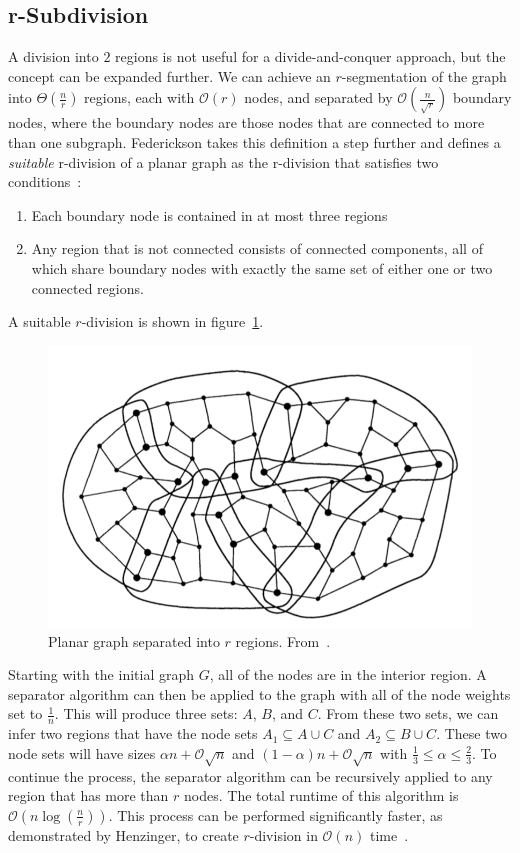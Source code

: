 \documentclass[11pt]{article}
\begin{document}
\subsection{r-Subdivision}
\label{sec:graph-sep-rsub}

A division into $2$ regions is not useful for a divide-and-conquer approach, but the concept can be expanded further. We can achieve an $r$-segmentation of the graph into $\Theta \left (\frac{n}{r} \right )$ regions, each with $\mathcal{O}(r)$ nodes, and separated by $\mathcal{O} \left (\frac{n}{\sqrt{r}} \right )$ boundary nodes, where the boundary nodes are those nodes that are connected to more than one subgraph. Federickson takes this definition a step further and defines a \textit{suitable} r-division of a planar graph as the r-division that satisfies two conditions~\cite{federickson1987fast}:
\begin{enumerate}
    \item Each boundary node is contained in at most three regions

    \item Any region that is not connected consists of connected components, all of which share boundary nodes with exactly the same set of either one or two connected regions.
\end{enumerate}
A suitable $r$-division is shown in figure~\ref{fig:rsep}.

\begin{figure}[!htb]
    \centering
    \includegraphics[width=.4\textwidth]{rsep}
    \caption{Planar graph separated into $r$ regions. From~\cite{federickson1987fast}.}
    \label{fig:rsep}
\end{figure}

Starting with the initial graph $G$, all of the nodes are in the interior region. A separator algorithm can then be applied to the graph with all of the node weights set to $\frac{1}{n}$. This will produce three sets: $A$, $B$, and $C$. From these two sets, we can infer two regions that have the node sets $A_1 \subseteq A \cup C$ and $A_2 \subseteq B \cup C$. These two node sets will have sizes $\alpha n + \mathcal{O}\sqrt{n}$ and $(1 - \alpha) n + \mathcal{O}\sqrt{n}$ with $\frac{1}{3} \leq \alpha \leq \frac{2}{3}$. To continue the process, the separator algorithm can be recursively applied to any region that has more than $r$ nodes. The total runtime of this algorithm is $\mathcal{O} \left (n \log \left (\frac{n}{r} \right ) \right )$. This process can be performed significantly faster, as demonstrated by Henzinger, to create $r$-division in $\mathcal{O}(n)$ time~\cite{henzinger1997faster}.
\end{document}
